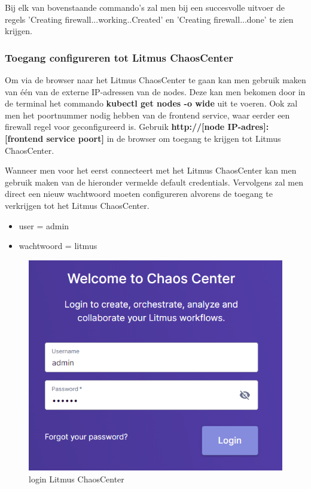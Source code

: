 Bij elk van bovenstaande commando's zal men bij een succesvolle uitvoer de regels 'Creating firewall...working..Created' en 'Creating firewall...done' te zien krijgen. 

\subsubsection{Toegang configureren tot Litmus ChaosCenter}

Om via de browser naar het Litmus ChaosCenter te gaan kan men gebruik maken van één van de externe IP-adressen van de nodes. Deze kan men bekomen door in de terminal het commando {\bf kubectl get nodes -o wide} uit te voeren. Ook zal men het poortnummer nodig hebben van de frontend service, waar eerder een firewall regel voor geconfigureerd is. Gebruik {\bf http://[node IP-adres]:[frontend service poort]} in de browser om toegang te krijgen tot Litmus ChaosCenter. 

Wanneer men voor het eerst connecteert met het Litmus ChaosCenter kan men gebruik maken van de hieronder vermelde default credentials. Vervolgens zal men direct een nieuw wachtwoord moeten configureren alvorens de toegang te verkrijgen tot het Litmus ChaosCenter.
\begin{itemize}
    \item user = admin
    \item wachtwoord = litmus
\end{itemize}

\begin{figure}[h]
    \centering
    \includegraphics[scale=.5]{img/chaoscenter-login.png}
    \caption{login Litmus ChaosCenter}
\end{figure}

